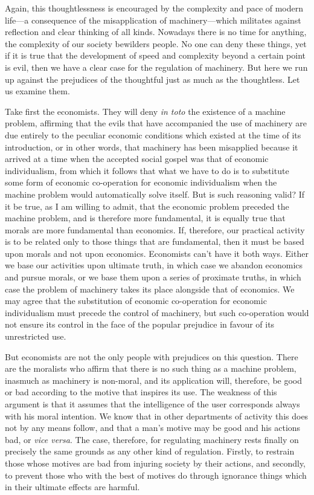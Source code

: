 \documentclass{book}
\begin{document}
Again, this thoughtlessness is encouraged by the complexity and pace of modern life—a consequence of the misapplication of machinery—which militates against reflection and clear thinking of all kinds. Nowadays there is no time for anything, the complexity of our society bewilders people. No one can deny these things, yet if it is true that the development of speed and complexity beyond a certain point is evil, then we have a clear case for the regulation of machinery. But here we run up against the prejudices of the thoughtful just as much as the thoughtless. Let us examine them.

Take first the economists. They will deny \emph{in toto} the existence of a machine problem, affirming that the evils that have accompanied the use of machinery are due entirely to the peculiar economic conditions which existed at the time of its introduction, or in other words, that machinery has been misapplied because it arrived at a time when the accepted social gospel was that of economic individualism, from which it follows that what we have to do is to substitute some form of economic co-operation for economic individualism when the machine problem would automatically solve itself. But is such reasoning valid? If it be true, as I am willing to admit, that the economic problem preceded the machine problem, and is therefore more fundamental, it is equally true that morals are more fundamental than economics. If, therefore, our practical activity is to be related only to those things that are fundamental, then it must be based upon morals and not upon economics. Economists can’t have it both ways. Either we base our activities upon ultimate truth, in which case we abandon economics and pursue morals, or we base them upon a series of proximate truths, in which case the problem of machinery takes its place alongside that of economics. We may agree that the substitution of economic co-operation for economic individualism must precede the control of machinery, but such co-operation would not ensure its control in the face of the popular prejudice in favour of its unrestricted use.

But economists are not the only people with prejudices on this question. There are the moralists who affirm that there is no such thing as a machine problem, inasmuch as machinery is non-moral, and its application will, therefore, be good or bad according to the motive that inspires its use. The weakness of this argument is that it assumes that the intelligence of the user corresponds always with his moral intention. We know that in other departments of activity this does not by any means follow, and that a man’s motive may be good and his actions bad, or \emph{vice versa}. The case, therefore, for regulating machinery rests finally on precisely the same grounds as any other kind of regulation. Firstly, to restrain those whose motives are bad from injuring society by their actions, and secondly, to prevent those who with the best of motives do through ignorance things which in their ultimate effects are harmful.
\end{document}
